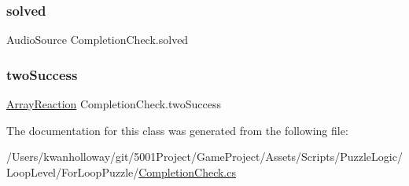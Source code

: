 \mbox{\label{class_completion_check_ab3aee64fe90f53bb4cff27b659072472}} 
\subsubsection{\texorpdfstring{solved}{solved}}
{\footnotesize\ttfamily Audio\+Source Completion\+Check.\+solved}

\mbox{\label{class_completion_check_a565266c6464718da6c52d813c3b0ff32}} 
\subsubsection{\texorpdfstring{two\+Success}{twoSuccess}}
{\footnotesize\ttfamily \hyperlink{class_array_reaction}{Array\+Reaction} Completion\+Check.\+two\+Success}



The documentation for this class was generated from the following file\+:\begin{DoxyCompactItemize}
\item 
/\+Users/kwanholloway/git/5001\+Project/\+Game\+Project/\+Assets/\+Scripts/\+Puzzle\+Logic/\+Loop\+Level/\+For\+Loop\+Puzzle/\hyperlink{_completion_check_8cs}{Completion\+Check.\+cs}\end{DoxyCompactItemize}
